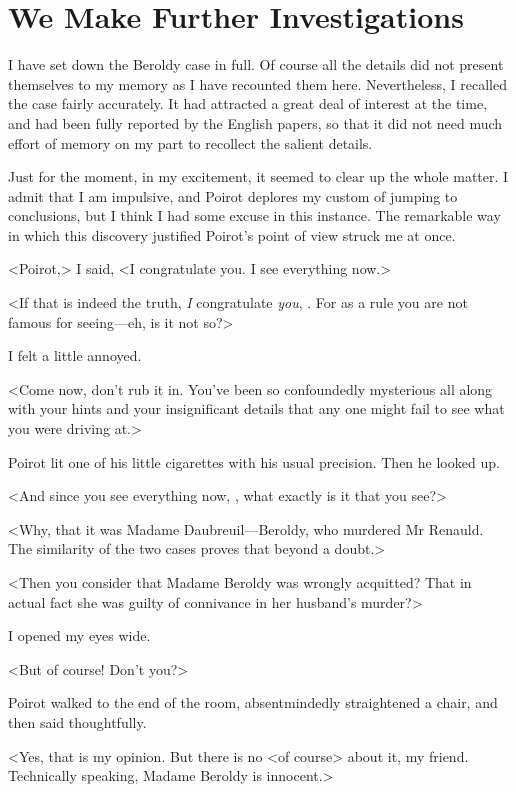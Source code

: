 \chapter{We Make Further Investigations}

\lettrine{I}{} have set down the Beroldy case in full. Of course all the details did not present themselves to my memory as I have recounted them here. Nevertheless, I recalled the case fairly accurately. It had attracted a great deal of interest at the time, and had been fully reported by the English papers, so that it did not need much effort of memory on my part to recollect the salient details. 

 Just for the moment, in my excitement, it seemed to clear up the whole matter. I admit that I am impulsive, and Poirot deplores my custom of jumping to conclusions, but I think I had some excuse in this instance. The remarkable way in which this discovery justified Poirot's point of view struck me at once. 

 <Poirot,> I said, <I congratulate you. I see everything now.> 

 <If that is indeed the truth, \emph{I} congratulate \emph{you}, . For as a rule you are not famous for seeing—eh, is it not so?> 

 I felt a little annoyed. 

 <Come now, don't rub it in. You've been so confoundedly mysterious all along with your hints and your insignificant details that any one might fail to see what you were driving at.> 

 Poirot lit one of his little cigarettes with his usual precision. Then he looked up. 

 <And since you see everything now, , what exactly is it that you see?> 

 <Why, that it was Madame Daubreuil—Beroldy, who murdered Mr Renauld. The similarity of the two cases proves that beyond a doubt.> 

 <Then you consider that Madame Beroldy was wrongly acquitted? That in actual fact she was guilty of connivance in her husband's murder?> 

 I opened my eyes wide. 

 <But of course! Don't you?> 

 Poirot walked to the end of the room, absentmindedly straightened a chair, and then said thoughtfully. 

 <Yes, that is my opinion. But there is no <of course> about it, my friend. Technically speaking, Madame Beroldy is innocent.> 

